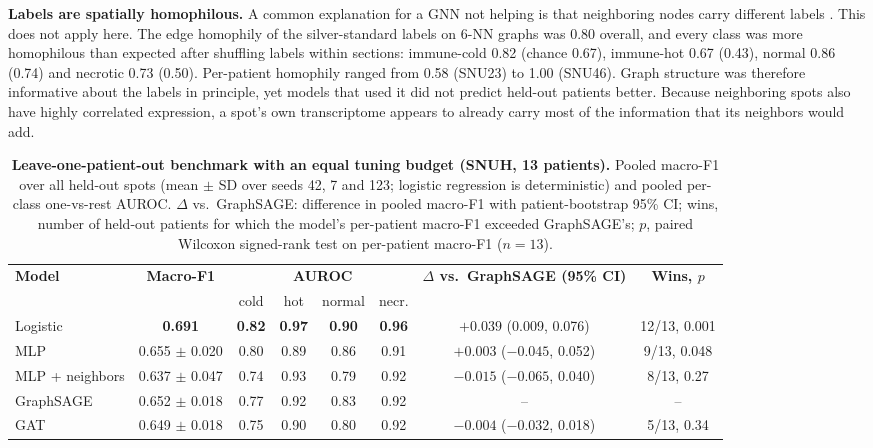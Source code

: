 \documentclass[11pt,letterpaper]{article}
\begin{document}
\textbf{Labels are spatially homophilous.} A common explanation for a GNN not helping is that neighboring nodes carry different labels \cite{zhu2020homophily}. This does not apply here. The edge homophily of the silver-standard labels on 6-NN graphs was 0.80 overall, and every class was more homophilous than expected after shuffling labels within sections: immune-cold 0.82 (chance 0.67), immune-hot 0.67 (0.43), normal 0.86 (0.74) and necrotic 0.73 (0.50). Per-patient homophily ranged from 0.58 (SNU23) to 1.00 (SNU46). Graph structure was therefore informative about the labels in principle, yet models that used it did not predict held-out patients better. Because neighboring spots also have highly correlated expression, a spot's own transcriptome appears to already carry most of the information that its neighbors would add.

\begin{table}[H]
\centering
\caption{\textbf{Leave-one-patient-out benchmark with an equal tuning budget (SNUH, 13 patients).} Pooled macro-F1 over all held-out spots (mean $\pm$ SD over seeds 42, 7 and 123; logistic regression is deterministic) and pooled per-class one-vs-rest AUROC. $\Delta$ vs.\ GraphSAGE: difference in pooled macro-F1 with patient-bootstrap 95\% CI; wins, number of held-out patients for which the model's per-patient macro-F1 exceeded GraphSAGE's; $p$, paired Wilcoxon signed-rank test on per-patient macro-F1 ($n = 13$).}
\label{tab:lopo}
\small
\begin{tabular}{lccccccc}
\toprule
\textbf{Model} & \textbf{Macro-F1} & \multicolumn{4}{c}{\textbf{AUROC}} & \textbf{$\Delta$ vs.\ GraphSAGE (95\% CI)} & \textbf{Wins, $p$} \\
 & & cold & hot & normal & necr. & & \\
\midrule
Logistic         & \textbf{0.691}           & \textbf{0.82} & \textbf{0.97} & \textbf{0.90} & \textbf{0.96} & $+0.039$ (0.009, 0.076)  & 12/13, 0.001 \\
MLP              & 0.655 $\pm$ 0.020        & 0.80 & 0.89 & 0.86 & 0.91 & $+0.003$ ($-0.045$, 0.052) & 9/13, 0.048 \\
MLP + neighbors  & 0.637 $\pm$ 0.047        & 0.74 & 0.93 & 0.79 & 0.92 & $-0.015$ ($-0.065$, 0.040) & 8/13, 0.27 \\
GraphSAGE        & 0.652 $\pm$ 0.018        & 0.77 & 0.92 & 0.83 & 0.92 & -- & -- \\
GAT              & 0.649 $\pm$ 0.018        & 0.75 & 0.90 & 0.80 & 0.92 & $-0.004$ ($-0.032$, 0.018) & 5/13, 0.34 \\
\bottomrule
\end{tabular}
\end{table}
\end{document}
